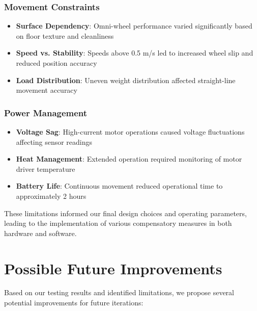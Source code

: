 \documentclass{article}
\begin{document}
\subsubsection{Movement Constraints}
\begin{itemize}
    \item \textbf{Surface Dependency}: Omni-wheel performance varied significantly based on floor texture and cleanliness
    \item \textbf{Speed vs. Stability}: Speeds above 0.5 m/s led to increased wheel slip and reduced position accuracy
    \item \textbf{Load Distribution}: Uneven weight distribution affected straight-line movement accuracy
\end{itemize}

\subsubsection{Power Management}
\begin{itemize}
    \item \textbf{Voltage Sag}: High-current motor operations caused voltage fluctuations affecting sensor readings
    \item \textbf{Heat Management}: Extended operation required monitoring of motor driver temperature
    \item \textbf{Battery Life}: Continuous movement reduced operational time to approximately 2 hours
\end{itemize}

These limitations informed our final design choices and operating parameters, leading to the implementation of various compensatory measures in both hardware and software.

\newpage
\section{Possible Future Improvements}
Based on our testing results and identified limitations, we propose several potential improvements for future iterations:
\end{document}
